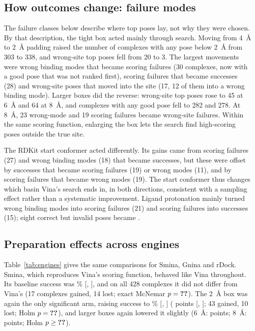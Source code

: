 \subsection{How outcomes change: failure modes}

The failure classes below describe where top poses lay, not why they were chosen. By that
description, the tight box acted mainly through search. Moving from \SI{4}{\angstrom} to
\SI{2}{\angstrom} padding raised the number of complexes with any pose below
\SI{2}{\angstrom} from 303 to 338, and wrong-site top poses fell from 20 to 3. The largest
movements were wrong binding modes that became scoring failures (30 complexes, now with a
good pose that was not ranked first), scoring failures that became successes (28) and
wrong-site poses that moved into the site (17, 12 of them into a wrong binding mode). Larger boxes did the reverse: wrong-site top
poses rose to 45 at \SI{6}{\angstrom} and 64 at \SI{8}{\angstrom}, and complexes with any
good pose fell to 282 and 278. At \SI{8}{\angstrom}, 23 wrong-mode and 19 scoring failures
became wrong-site failures. Within the same scoring function, enlarging the box lets the
search find high-scoring poses outside the true site.

The RDKit start conformer acted differently. Its gains came from scoring failures (27) and
wrong binding modes (18) that became successes, but these were offset by successes that
became scoring failures (19) or wrong modes (11), and by scoring failures that became wrong
modes (19). The start conformer thus changes which basin Vina's search ends in, in both
directions, consistent with a sampling effect rather than a systematic improvement.
Ligand protonation mainly turned wrong binding modes into scoring failures (21) and scoring
failures into successes (15); eight correct but invalid poses became \pbvalid{}.

\subsection{Preparation effects across engines}

Table~\ref{tab:engines} gives the same comparisons for Smina, Gnina and rDock. Smina, which reproduces Vina's scoring function, behaved like Vina
throughout. Its baseline success was \% [, ], and on all 428 complexes it did
not differ from Vina's (17 complexes gained, 14 lost; exact McNemar $p = \val{engines/smina/vina/all/p}$). The
\SI{2}{\angstrom} box was again the only significant arm, raising success to \%
[, ] ( points [, ]; 43 gained, 10 lost; Holm $p = \val{comparisons/smina/top1/box_padding_2/p_holm}$), and larger
boxes again lowered it slightly (\SI{6}{\angstrom}:  points; \SI{8}{\angstrom}:
 points; Holm $p \ge \val{comparisons/smina/top1/box_padding_8/p_holm}$).

